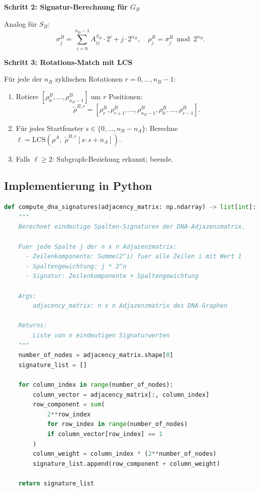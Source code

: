 ﻿\documentclass[a4paper,12pt]{article}
\theoremstyle{definition}
\begin{document}
\textbf{Schritt 2: Signatur-Berechnung für $G_B$}

Analog für $S_B$:
\[
    \sigma_j^B = \sum_{i=0}^{n_B-1} A^{S_B}_{ij} \cdot 2^i + j \cdot 2^{n_B},
    \quad \rho_j^B = \sigma_j^B \bmod 2^{n_B}.
\]

\textbf{Schritt 3: Rotations-Match mit LCS}

F\"{u}r jede der $n_B$ zyklischen Rotationen $r = 0, \ldots, n_B - 1$:
\begin{enumerate}
    \item Rotiere $[\rho_0^B, \ldots, \rho_{n_B-1}^B]$ um $r$ Positionen:
          \[
              \tilde{\rho}^{B,r} = [\rho_r^B, \rho_{r+1}^B, \ldots,
                                     \rho_{n_B-1}^B, \rho_0^B, \ldots, \rho_{r-1}^B].
          \]
    \item F\"{u}r jedes Startfenster $s \in \{0, \ldots, n_B - n_A\}$:
          Berechne
          $\ell = \mathrm{LCS}(\rho^A,\;
                               \tilde{\rho}^{B,r}[s : s + n_A])$.
    \item Falls $\ell \geq 2$: Subgraph-Beziehung erkannt; beende.
\end{enumerate}

\subsection{Implementierung in Python}

\begin{lstlisting}[language=Python, caption=Signatur-Berechnung für DNA-Adjazenzmatrix]
def compute_dna_signatures(adjacency_matrix: np.ndarray) -> list[int]:
    """
    Berechnet eindeutige Spalten-Signaturen der DNA-Adjazenzmatrix.

    Fuer jede Spalte j der n x n Adjazenzmatrix:
      - Zeilenkomponente: Summe(2^i) fuer alle Zeilen i mit Wert 1
      - Spaltengewichtung: j * 2^n
      - Signatur: Zeilenkomponente + Spaltengewichtung

    Args:
        adjacency_matrix: n x n Adjazenzmatrix des DNA-Graphen

    Returns:
        Liste von n eindeutigen Signaturwerten
    """
    number_of_nodes = adjacency_matrix.shape[0]
    signature_list = []

    for column_index in range(number_of_nodes):
        column_vector = adjacency_matrix[:, column_index]
        row_component = sum(
            2**row_index
            for row_index in range(number_of_nodes)
            if column_vector[row_index] == 1
        )
        column_weight = column_index * (2**number_of_nodes)
        signature_list.append(row_component + column_weight)

    return signature_list
\end{lstlisting}
\end{document}
